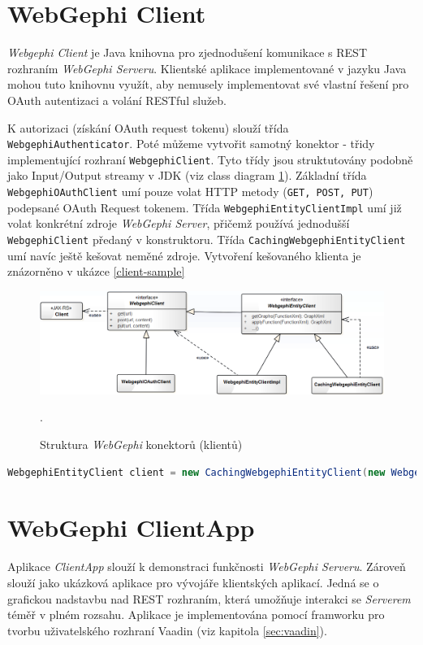 \documentclass[thesis=M,czech]{FITthesis}[2014/05/6]
\begin{document}
\section{WebGephi Client}
\textit{Webgephi Client} je Java knihovna pro zjednodušení komunikace s REST rozhraním \textit{WebGephi Serveru}. Klientské aplikace 
implementované v jazyku Java mohou tuto knihovnu využít, aby nemusely implementovat své vlastní řešení pro OAuth autentizaci a volání RESTful služeb.

K autorizaci (získání OAuth request tokenu) slouží třída \texttt{WebgephiAuthen\-ticator}. Poté můžeme vytvořit samotný konektor - třidy implementující 
rozhraní \texttt{WebgephiClient}. Tyto třídy jsou struktutovány podobně jako In\-put/Out\-put streamy v JDK (viz class diagram \ref{fig:webgephi-client-impl}). Základní třída \texttt{Webgephi\-OAuthClient} umí pouze
volat HTTP metody (\texttt{GET, POST, PUT}) podepsané OAuth Request tokenem. Třída \texttt{WebgephiEntityClientImpl} umí již volat konkrétní zdroje \textit{WebGephi Server}, 
přičemž používá jednodušší \texttt{Webgephi\-Client} předaný v konstruktoru. Třída \texttt{Caching\-Webgephi\-Entity\-Client} umí navíc ještě kešovat neměné zdroje. Vytvoření kešovaného klienta 
je znázorněno v ukázce \ref{client-sample} 

\begin{figure}\centering
 	\includegraphics[width=1\textwidth]{images/diagram/webgephi-client-impl}
 	\caption[Struktura \textit{WebGephi} konektorů (klientů)]{Struktura \textit{WebGephi} konektorů (klientů)}.\label{fig:webgephi-client-impl}
\end{figure}

\begin{lstlisting}[caption=Vytvoření \texttt{CachingWebgephiEntityClient}, label=client-sample, language=java]
WebgephiEntityClient client = new CachingWebgephiEntityClient(new WebgephiEntityClientImpl(new WebgephiOAuthClient("https://webgephi.local:8443/rest/v1", accessToken)));
\end{lstlisting} 

\section{WebGephi ClientApp}
Aplikace \textit{ClientApp} slouží k demonstraci funkčnosti \textit{WebGephi Serveru}. Zároveň slouží jako ukázková aplikace pro vývojáře klientských aplikací. Jedná se 
o grafickou nadstavbu nad REST rozhraním, která umožňuje interakci se \textit{Serverem} téměř v plném rozsahu. Aplikace je implementována pomocí framworku 
pro tvorbu uživatelského rozhraní Vaadin (viz kapitola \ref{sec:vaadin}).
\end{document}
